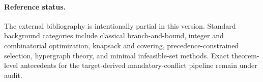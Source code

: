 \paragraph{Reference status.}
The external bibliography is intentionally partial in this version. Standard background categories include classical branch-and-bound, integer and combinatorial optimization, knapsack and covering, precedence-constrained selection, hypergraph theory, and minimal infeasible-set methods. Exact theorem-level antecedents for the target-derived mandatory-conflict pipeline remain under audit.
